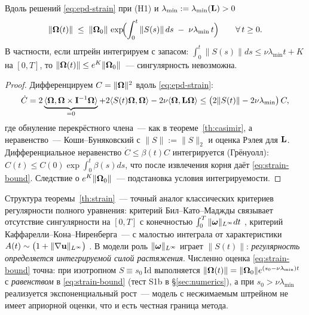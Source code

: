 \begin{theorem}[условная]\label{th:strain}
Вдоль решений \eqref{eq:epd-strain} при \textup{(H1)} и
$\lambda_{\min} := \lambda_{\min}(\mathbf{L}) > 0$
\begin{equation}\label{eq:strain-bound}
  \|\boldsymbol{\Omega}(t)\| \;\le\; \|\boldsymbol{\Omega}_0\|\,
  \exp\!\Bigl(\int_0^t \|S(s)\|\,ds \;-\; \nu\lambda_{\min}\,t\Bigr)
  \qquad \forall\, t \ge 0 .
\end{equation}
В частности, если штрейн интегрируем с запасом:
$\int_0^t\|S(s)\|ds \le \nu\lambda_{\min}t + K$ на $[0,T]$, то
$\|\boldsymbol{\Omega}(t)\| \le e^{K}\|\boldsymbol{\Omega}_0\|$~--- сингулярность невозможна.
\end{theorem}

\begin{proof}
Дифференцируем $C = \|\boldsymbol{\Omega}\|^2$ вдоль \eqref{eq:epd-strain}:
\[
  \dot C = 2\underbrace{\langle\boldsymbol{\Omega},\boldsymbol{\Omega}\times\mathbf{I}^{-1}\boldsymbol{\Omega}\rangle}_{=0}
  + 2\langle S(t)\boldsymbol{\Omega},\boldsymbol{\Omega}\rangle - 2\nu\langle\boldsymbol{\Omega},\mathbf{L}\boldsymbol{\Omega}\rangle
  \le \bigl(2\|S(t)\| - 2\nu\lambda_{\min}\bigr)\,C ,
\]
где обнуление перекрёстного члена~--- как в теореме~\ref{th:casimir},
а неравенство~--- Коши--Буняковский с $\|S\| := \|S\|_{2}$ и оценка
Рэлея для $\mathbf{L}$. Дифференциальное неравенство
$\dot C \le \beta(t)C$ интегрируется (Грёнуолл):
$C(t) \le C(0)\exp\int_0^t\beta(s)ds$, что после извлечения корня даёт
\eqref{eq:strain-bound}. Следствие о $e^K\|\boldsymbol{\Omega}_0\|$~--- подстановка
условия интегрируемости.
\end{proof}

\begin{corollary}\label{cor:bkm}
Структура теоремы~\ref{th:strain}~--- точный аналог классических
критериев регулярности полного уравнения: критерий
Бил--Като--Маджды связывает отсутствие сингулярности на $[0,T]$ с
конечностью $\int_0^T\|\boldsymbol{\omega}\|_{L^\infty}dt$ \cite{bkm}, критерий
Каффарелли--Кона--Ниренберга~--- с малостью интеграла от
характеристики $A(t) \sim \bigl(1 + \|\nabla\mathbf{u}\|_{L^\infty}\bigr)$
\cite{ckn}. В модели роль $\|\boldsymbol{\omega}\|_{L^\infty}$ играет $\|S(t)\|$:
\emph{регулярность определяется интегрируемой силой растяжения}.
Численно оценка \eqref{eq:strain-bound} точна: при изотропном
$S \equiv s_0\,\mathrm{Id}$ выполняется $\|\boldsymbol{\Omega}(t)\| =
\|\boldsymbol{\Omega}_0\|e^{(s_0-\nu\lambda_{\min})t}$ с \emph{равенством} в
\eqref{eq:strain-bound} (тест S1b в \S\ref{sec:numerics}), а при
$s_0 > \nu\lambda_{\min}$ реализуется экспоненциальный рост~--- модель
с несжимаемым штрейном не имеет априорной оценки, что и есть
честная граница метода.
\end{corollary}

